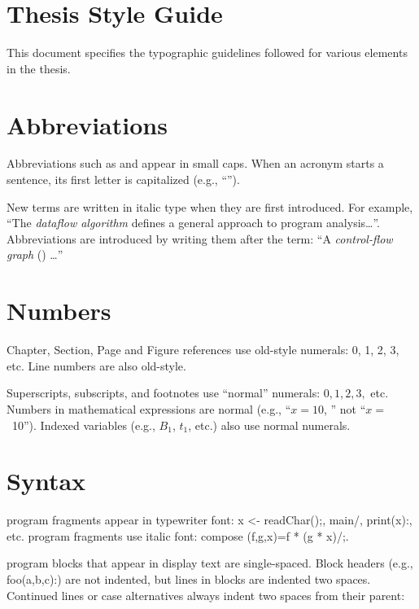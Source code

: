 \fancyhf{}
\numbersoff


\section*{Thesis Style Guide}

This document specifies the typographic guidelines followed for various
elements in the thesis. 

\section*{Abbreviations}
Abbreviations such as \mil and \cfg appear in small caps. When an
acronym starts a sentence, its first letter is capitalized (e.g.,
``\Mil'').

New terms are written in italic type when they are first
introduced. For example, ``The \emph{dataflow algorithm} defines a
general approach to program analysis\dots''. Abbreviations
are introduced by writing them after the term: ``A \emph{control-flow graph}
(\cfg) \dots''

\section*{Numbers}
Chapter, Section, Page and Figure references use old-style numerals:
0, 1, 2, 3, etc.  Line numbers are also old-style.

Superscripts, subscripts, and footnotes use ``normal'' numerals: $0,
1, 2, 3,$ etc.  Numbers in mathematical expressions are normal (e.g.,
``$x = 10$, '' not ``$x = $\ 10'').  Indexed variables (e.g., $B_1$,
$t_1$, etc.) also use normal numerals.

\section*{Syntax}
\Mil program fragments appear in typewriter font: \binds x <- \goto readChar();,
\lab main/, \block print(x):, etc. \lamC program fragments use italic
font: \lcdef compose (f,g,x)=\lcapp f * (g * x)/;.

\Mil program blocks that appear in display text are
single-spaced. Block headers (e.g., \block foo(a,b,c):) are not
indented, but lines in blocks are indented two spaces. Continued lines
or case alternatives always indent two spaces from their parent:

\begin{singlespace}\correctspaceskip
{}
\end{singlespace}


